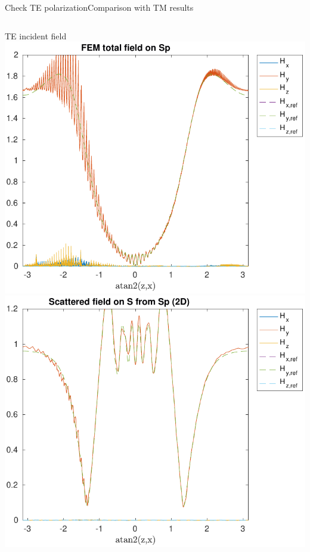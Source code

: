 \begin{frame}[allowframebreaks]{Check TE polarization}{Comparison
      with TM results}
\begin{columns}
      \hfill TE incident field \hfill\mbox{}
      \vspace{1ex}
      \includegraphics[width=\linewidth]{results/TE/H_Sp.pdf}
      \includegraphics[width=\linewidth]{results/TE/H_S.pdf}
      
    \end{columns}
    
  \end{frame}

  
